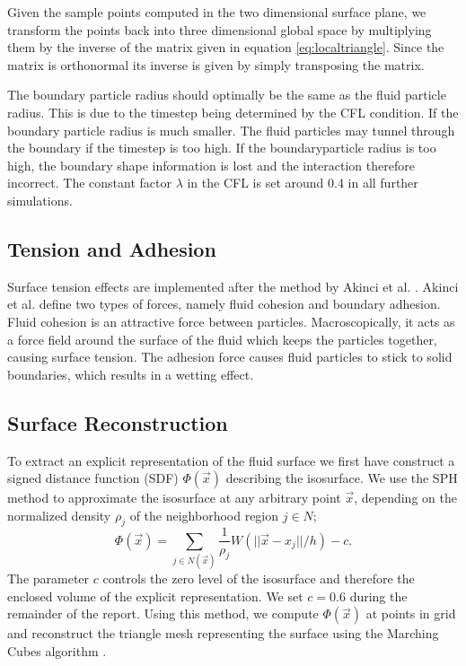 \documentclass[11pt, letterpaper, twocolumn]{article}
\begin{document}
Given the sample points computed in the two dimensional surface plane, we transform the points back into three dimensional global space by multiplying them by the inverse of the matrix given in equation \ref{eq:localtriangle}. Since the matrix is orthonormal its inverse is given by simply transposing the matrix.


The boundary particle radius should optimally be the same as the fluid particle radius. This is due to the timestep being determined by the CFL condition. If the boundary particle radius is much smaller. The fluid particles may tunnel through the boundary if the timestep is too high. If the boundaryparticle radius is too high, the boundary shape information is lost and the interaction therefore incorrect. The constant factor \(\lambda\) in the CFL is set around 0.4 in all further simulations.

\subsection{Tension and Adhesion}
Surface tension effects are implemented after the method by Akinci et al. \cite{akinci2013}.
Akinci et al. define two types of forces, namely fluid cohesion and boundary adhesion. Fluid cohesion is an attractive force between particles. Macroscopically, it acts as a force field around the surface of the fluid which keeps the particles together, causing surface tension. The adhesion force causes fluid particles to stick to solid boundaries, which results in a wetting effect.

\subsection{Surface Reconstruction}
To extract an explicit representation of the fluid surface we first have construct a signed distance function (SDF) \(\Phi(\vec{x}) \) describing the isosurface. We use the SPH method to approximate the isosurface at any arbitrary point \(\vec{x}\), depending on the normalized density \(\rho_j\) of the neighborhood region \(j \in N\);
\begin{equation}
  \Phi(\vec{x})= \sum_{j \in N(\vec{x})}\frac{1}{\rho_j} W(||\vec{x} - x_j|| / h) - c.
\end{equation}
The parameter \(c\) controls the zero level of the isosurface and therefore the enclosed volume of the explicit representation. We set \(c = 0.6\) during the remainder of the report. Using this method, we compute \(\Phi(\vec{x})\) at points in grid and reconstruct the triangle mesh representing the surface using the Marching Cubes algorithm \cite{lorensen1987}.
\end{document}
